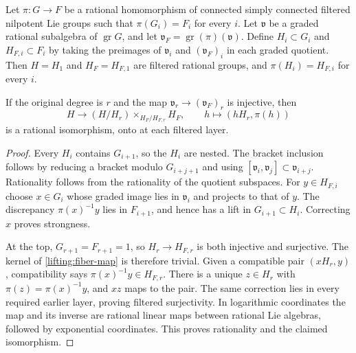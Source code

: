 \begin{lemma}
\label{lifting:refiltration}
Let $\pi:G\to F$ be a rational homomorphism of connected simply
connected filtered nilpotent Lie groups such that
$\pi(G_i)=F_i$ for every $i$.  Let $\mathfrak v$ be a graded rational
subalgebra of $\operatorname{gr}G$, and let
$\mathfrak v_F=\operatorname{gr}(\pi)(\mathfrak v)$.
Define $H_i\subset G_i$ and $H_{F,i}\subset F_i$ by taking the
preimages of $\mathfrak v_i$ and $(\mathfrak v_F)_i$ in each graded
quotient.  Then $H=H_1$ and $H_F=H_{F,1}$ are filtered rational
groups, and $\pi(H_i)=H_{F,i}$ for every $i$.

If the original degree is $r$ and the map
$\mathfrak v_r\to(\mathfrak v_F)_r$ is injective, then
\begin{equation}
 H\longrightarrow
 (H/H_r)\mathop{\times}_{H_F/H_{F,r}}H_F,
 \qquad h\longmapsto(hH_r,\pi(h))
 \label{lifting:fiber-map}
\end{equation}
is a rational isomorphism, onto at each filtered layer.
\end{lemma}

\begin{proof}
Every $H_i$ contains $G_{i+1}$, so the $H_i$ are nested.
The bracket inclusion follows by reducing a bracket modulo
$G_{i+j+1}$ and using
$[\mathfrak v_i,\mathfrak v_j]\subset\mathfrak v_{i+j}$.
Rationality follows from the rationality of the quotient subspaces.
For $y\in H_{F,i}$ choose $x\in G_i$ whose graded image lies in
$\mathfrak v_i$ and projects to that of $y$.
The discrepancy $\pi(x)^{-1}y$ lies in $F_{i+1}$, and hence has a
lift in $G_{i+1}\subset H_i$.  Correcting $x$ proves strongness.

At the top, $G_{r+1}=F_{r+1}=1$, so $H_r\to H_{F,r}$ is both
injective and surjective.  The kernel of
\eqref{lifting:fiber-map} is therefore trivial.
Given a compatible pair $(xH_r,y)$, compatibility says
$\pi(x)^{-1}y\in H_{F,r}$.  There is a unique $z\in H_r$ with
$\pi(z)=\pi(x)^{-1}y$, and $xz$ maps to the pair.
The same correction lies in every required earlier layer, proving
filtered surjectivity.  In logarithmic coordinates the map and its
inverse are rational linear maps between rational Lie algebras,
followed by exponential coordinates.  This proves rationality and
the claimed isomorphism.
\end{proof}

